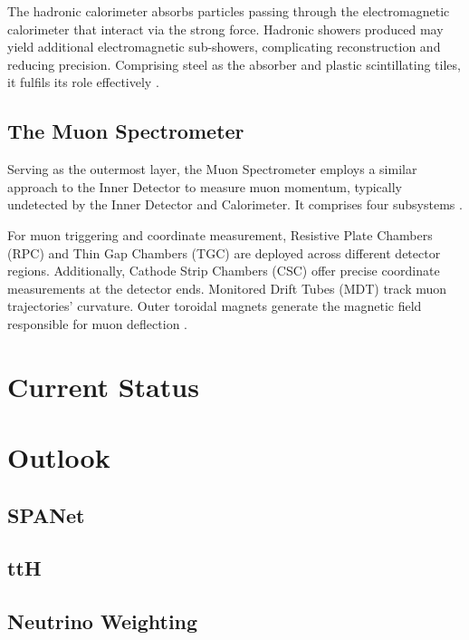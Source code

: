 The hadronic calorimeter absorbs particles passing through the electromagnetic calorimeter that interact via the strong force. Hadronic showers produced may yield additional electromagnetic sub-showers, complicating reconstruction and reducing precision. Comprising steel as the absorber and plastic scintillating tiles, it fulfils its role effectively \cite{atlas_calorimeter}.

\section*{The Muon Spectrometer}
Serving as the outermost layer, the Muon Spectrometer employs a similar approach to the Inner Detector to measure muon momentum, typically undetected by the Inner Detector and Calorimeter. It comprises four subsystems \cite{atlas}.

For muon triggering and coordinate measurement, Resistive Plate Chambers (RPC) and Thin Gap Chambers (TGC) are deployed across different detector regions. Additionally, Cathode Strip Chambers (CSC) offer precise coordinate measurements at the detector ends. Monitored Drift Tubes (MDT) track muon trajectories' curvature. Outer toroidal magnets generate the magnetic field responsible for muon deflection \cite{atlas}.


\chapter{Current Status}
\label{ch:current_status}

\chapter{Outlook}
\label{ch:outlook}

\section{SPANet}
\section{ttH}
\section{Neutrino Weighting}
